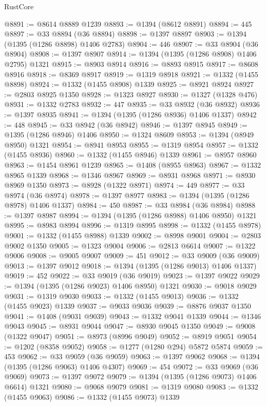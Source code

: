 \begin{lexlean}{RustCore}
\begin{coremodule}
@8891 := @8614 @8889 @1239
@8893 := @1394 (@8612 @8891)
@8894 := 445
@8897 := @33 @8894 (@36 @8894)
@8898 := @1397 @8897
@8903 := @1394 (@1395 (@1286 @8898) @1406 @2783)
@8904 := 446
@8907 := @33 @8904 (@36 @8904)
@8908 := @1397 @8907
@8914 := @1394 (@1395 (@1286 @8908) @1406 @2795) @1321
@8915 := @8903 @8914
@8916 := @8893 @8915
@8917 := @8608 @8916
@8918 := @8369 @8917
@8919 := @1319 @8918
@8921 := @1332 (@1455 @8898)
@8924 := @1332 (@1455 @8908) @1339
@8925 := @8921 @8924
@8927 := @2803 @8925 @1350
@8928 := @1323 @8927
@8930 := @1327 (@1328 @476)
@8931 := @1332 @2783
@8932 := 447
@8935 := @33 @8932 (@36 @8932)
@8936 := @1397 @8935
@8941 := @1394 (@1395 (@1286 @8936) @1406 @1337)
@8942 := 448
@8945 := @33 @8942 (@36 @8942)
@8946 := @1397 @8945
@8949 := @1395 (@1286 @8946) @1406
@8950 := @1324 @8609
@8953 := @1394 (@8949 @8950) @1321
@8954 := @8941 @8953
@8955 := @1319 @8954
@8957 := @1332 (@1455 @8936)
@8960 := @1332 (@1455 @8946) @1339
@8961 := @8957 @8960
@8963 := @1454 @8961 @1239
@8965 := @1408 (@8955 @8963)
@8967 := @1332 @8965 @1339
@8968 := @1346 @8967
@8969 := @8931 @8968
@8971 := @8930 @8969 @1350
@8973 := @8928 (@1322 @8971)
@8974 := 449
@8977 := @33 @8974 (@36 @8974)
@8978 := @1397 @8977
@8983 := @1394 (@1395 (@1286 @8978) @1406 @1337)
@8984 := 450
@8987 := @33 @8984 (@36 @8984)
@8988 := @1397 @8987
@8994 := @1394 (@1395 (@1286 @8988) @1406 @8950) @1321
@8995 := @8983 @8994
@8996 := @1319 @8995
@8998 := @1332 (@1455 @8978)
@9001 := @1332 (@1455 @8988) @1339
@9002 := @8998 @9001
@9004 := @2803 @9002 @1350
@9005 := @1323 @9004
@9006 := @2813 @6614
@9007 := @1322 @9006
@9008 := @9005 @9007
@9009 := 451
@9012 := @33 @9009 (@36 @9009)
@9013 := @1397 @9012
@9018 := @1394 (@1395 (@1286 @9013) @1406 @1337)
@9019 := 452
@9022 := @33 @9019 (@36 @9019)
@9023 := @1397 @9022
@9029 := @1394 (@1395 (@1286 @9023) @1406 @8950) @1321
@9030 := @9018 @9029
@9031 := @1319 @9030
@9033 := @1332 (@1455 @9013)
@9036 := @1332 (@1455 @9023) @1339
@9037 := @9033 @9036
@9039 := @8876 @9037 @1350
@9041 := @1408 (@9031 @9039)
@9043 := @1332 @9041 @1339
@9044 := @1346 @9043
@9045 := @8931 @9044
@9047 := @8930 @9045 @1350
@9049 := @9008 (@1322 @9047)
@9051 := @8973 (@8996 @9049)
@9052 := @8919 @9051
@9054 := @1202 (@8358 @9052)
@9058 := @1277 (@1280 @294) @5872 @5874
@9059 := 453
@9062 := @33 @9059 (@36 @9059)
@9063 := @1397 @9062
@9068 := @1394 (@1395 (@1286 @9063) @1406 @4307)
@9069 := 454
@9072 := @33 @9069 (@36 @9069)
@9073 := @1397 @9072
@9079 := @1394 (@1395 (@1286 @9073) @1406 @6614) @1321
@9080 := @9068 @9079
@9081 := @1319 @9080
@9083 := @1332 (@1455 @9063)
@9086 := @1332 (@1455 @9073) @1339

\end{coremodule}
\end{lexlean}
